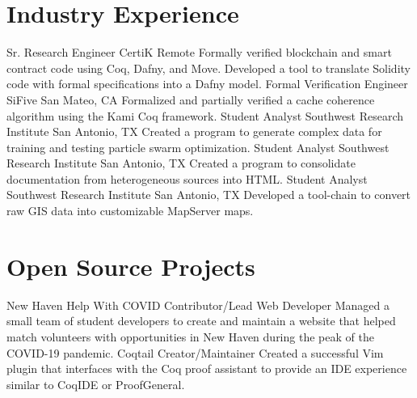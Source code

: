 \documentclass[10pt,letterpaper,sans]{moderncv}
\begin{document}
\section{Industry Experience}

        {Sr. Research Engineer}
        {CertiK}
        {Remote}
        {}
        {%
          Formally verified blockchain and smart contract code using Coq, Dafny,
          and Move.
          Developed a tool to translate Solidity code with formal specifications
          into a Dafny model.
        }
        {Formal Verification Engineer}
        {SiFive}
        {San Mateo, CA}
        {}
        {%
          Formalized and partially verified a cache coherence algorithm using
          the Kami Coq framework.
        }
        {Student Analyst}
        {Southwest Research Institute}
        {San Antonio, TX}
        {}
        {%
          Created a program to generate complex data for training and testing
          particle swarm optimization.
        }
        {Student Analyst}
        {Southwest Research Institute}
        {San Antonio, TX}
        {}
        {%
          Created a program to consolidate documentation from heterogeneous
          sources into HTML\@.
        }
        {Student Analyst}
        {Southwest Research Institute}
        {San Antonio, TX}
        {}
        {%
          Developed a tool-chain to convert raw GIS data into customizable
          MapServer maps.
        }

\section{Open Source Projects}

        {New Haven Help With COVID}
        {Contributor/Lead Web Developer}
        {
        }
        {}
        {%
          Managed a small team of student developers to create and maintain a
          website that helped match volunteers with opportunities in New Haven
          during the peak of the COVID-19 pandemic.
        }
        {Coqtail}
        {Creator/Maintainer}
        {}
        {}
        {%
          Created a successful Vim plugin that interfaces with the Coq proof
          assistant to provide an IDE experience similar to CoqIDE or ProofGeneral.
        }
\end{document}

